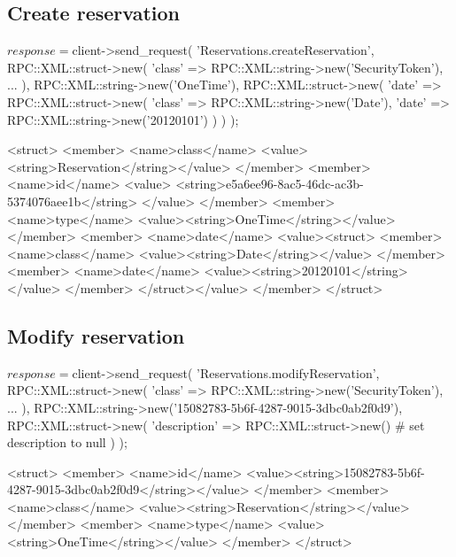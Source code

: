 \documentclass[a4paper]{report}
\begin{document}
\newpage
\subsection{Create reservation}
\begin{PerlCmd}
$response = $client->send_request(
    'Reservations.createReservation',
    RPC::XML::struct->new(
        'class' => RPC::XML::string->new('SecurityToken'),
        ...
    ),
    RPC::XML::string->new('OneTime'),
    RPC::XML::struct->new(
        'date' => RPC::XML::struct->new(
            'class' => RPC::XML::string->new('Date'),
            'date' => RPC::XML::string->new('20120101')
        )
    )
);
\end{PerlCmd}
\begin{PerlResponse}
<struct>
  <member>
    <name>class</name>
    <value><string>Reservation</string></value>
  </member>
  <member>
    <name>id</name>
    <value>
      <string>e5a6ee96-8ac5-46dc-ac3b-5374076aee1b</string>
    </value>
  </member>
  <member>
    <name>type</name>
    <value><string>OneTime</string></value>
  </member>
  <member>
    <name>date</name>
    <value><struct>
        <member>
          <name>class</name>
          <value><string>Date</string></value>
        </member>
        <member>
          <name>date</name>
          <value><string>20120101</string></value>
        </member>
    </struct></value>
  </member>
</struct>
\end{PerlResponse}

\newpage
\subsection{Modify reservation}
\begin{PerlCmd}
$response = $client->send_request(
    'Reservations.modifyReservation',
    RPC::XML::struct->new(
        'class' => RPC::XML::string->new('SecurityToken'),
        ...
    ),
    RPC::XML::string->new('15082783-5b6f-4287-9015-3dbc0ab2f0d9'),
    RPC::XML::struct->new(
        'description' => RPC::XML::struct->new() # set description to null
    )
);
\end{PerlCmd}
\begin{PerlResponse}
<struct>
  <member>
    <name>id</name>
    <value><string>15082783-5b6f-4287-9015-3dbc0ab2f0d9</string></value>
  </member>
  <member>
    <name>class</name>
    <value><string>Reservation</string></value>
  </member>
  <member>
    <name>type</name>
    <value><string>OneTime</string></value>
  </member>
</struct>
\end{PerlResponse}
\end{document}
